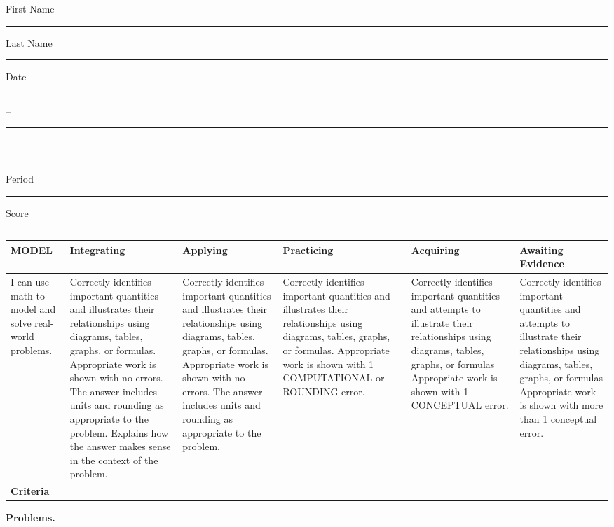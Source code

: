 \documentclass[twoside, 10pt]{article}
\title{}
\date{}
\begin{document}
\noindent
{\large
First Name \rule{6em}{.1pt}Last Name \rule{6em}{.1pt} Date \rule{1.5em}{.1pt} -- \rule{1.5em}{.1pt} -- \rule{1.5em}{.1pt} Period \rule{2em}{.1pt} Score \rule{2em}{.1pt}
}
\vspace{1em}

\begingroup
\renewcommand{\arraystretch}{1.5}
\begin{center}
\tiny
{
\begin{tabularx}{\textwidth}{|X|X|X|X|X|X|}
\hline
\bf MODEL & \centerline{Integrating} & \centerline{Applying} & \centerline{Practicing} & \centerline{Acquiring} & \centerline{Awaiting Evidence} \\
\hline
I can use math to model and solve real-world problems.&
Correctly identifies
important
quantities and
illustrates their
relationships using
diagrams, tables,
graphs, or
formulas.
Appropriate work is
shown with no
errors. The answer
includes units and
rounding as
appropriate to the
problem.
Explains how the
answer makes
sense in the
context of the
problem.
&Correctly identifies
important
quantities and
illustrates their
relationships using
diagrams, tables,
graphs, or
formulas.
Appropriate work is
shown with no
errors. The answer
includes units and
rounding as
appropriate to the
problem.
&Correctly identifies
important
quantities and
illustrates their
relationships using
diagrams, tables,
graphs, or
formulas.
Appropriate work is
shown with 1
COMPUTATIONAL
or ROUNDING
error.
&Correctly identifies
important
quantities and
attempts to
illustrate their
relationships using
diagrams, tables,
graphs, or formulas
Appropriate work is
shown with 1
CONCEPTUAL
error.
&Correctly identifies
important
quantities and
attempts to
illustrate their
relationships using
diagrams, tables,
graphs, or formulas
Appropriate work is
shown with more
than 1 conceptual
error.\\
\hline
\bf Criteria&\multicolumn{5}{l|}{\parbox[c][4em]{.8\textwidth}{}}\\
\hline
\end{tabularx}
}
\end{center}
\endgroup
\vspace{1em}

{\noindent\bf Problems.}
\end{document}
